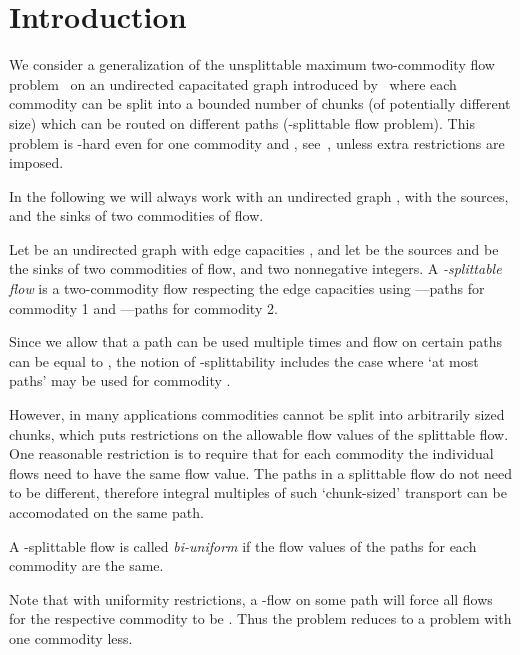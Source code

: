 \section{Introduction}
\label{sec:introduction}

We consider a generalization of the unsplittable maximum two-commodity
flow problem~\cite{kleinberg:96} on an undirected capacitated graph
 introduced by~\cite{baier-koehler-skutella:02} where each
commodity  can be split into a bounded number  of chunks (of
potentially different size) which can be routed on different paths
(-splittable flow problem). This problem is \NP-hard even for one
commodity and , see~\cite{baier-koehler-skutella:05}, unless
extra restrictions are imposed.

In the following we will always work with an undirected graph
, with  the sources, and  the
sinks of two commodities of flow.

\begin{definition}
  Let  be an undirected graph with edge capacities 
  , and let  be the
  sources and   be the sinks of two commodities of
  flow, and  two nonnegative integers. A
  \emph{-splittable flow} is a two-commodity flow
  respecting the edge capacities using
   ---paths for commodity 1 and 
  ---paths for commodity 2.
\end{definition}

Since we allow that a path can be used multiple times and flow on
certain paths can  be equal to , the notion of
-splittability includes the case where `at most  paths'
may be used for commodity .
 
However, in many applications commodities cannot be split into arbitrarily
sized chunks, which  puts restrictions on the allowable
flow values of the splittable flow. One reasonable restriction is to
require that for each commodity the individual flows need to have the
same flow value. The paths in a splittable flow do not
need to be different, therefore integral multiples of such `chunk-sized'
transport can be accomodated on the same path.

\begin{definition}
  A -splittable flow is called \emph{bi-uniform} if the flow
  values of the paths for each commodity are the same.
\end{definition}

Note that with uniformity restrictions, a -flow on some path will
force all flows for the respective commodity to be . Thus the
problem reduces to a problem with one commodity less.

